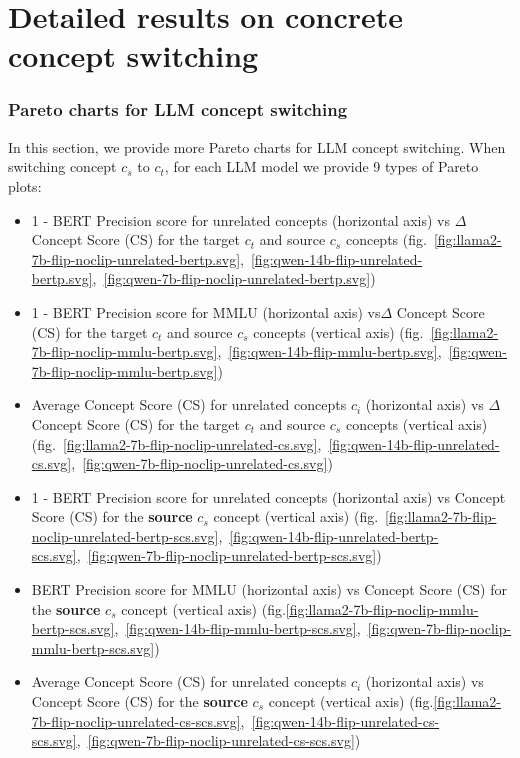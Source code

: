 \section{Detailed results on concrete concept switching}

\subsubsection{Pareto charts for LLM concept switching}
\label{sec:pareto_llm_switch}

In this section, we provide more Pareto charts for LLM concept switching. When switching concept $c_s$ to $c_t$, for each LLM model we provide 9 types of Pareto plots: 
\begin{itemize}
    \item 1 - BERT Precision score for unrelated concepts (horizontal axis) vs \textbf{$\Delta$} Concept Score (CS) for the target $c_t$ and source $c_s$ concepts (fig.~\ref{fig:llama2-7b-flip-noclip-unrelated-bertp.svg},~\ref{fig:qwen-14b-flip-unrelated-bertp.svg},~\ref{fig:qwen-7b-flip-noclip-unrelated-bertp.svg})
    \item 1 - BERT Precision score for MMLU (horizontal axis) vs\textbf{$\Delta$} Concept Score (CS) for the target $c_t$ and source $c_s$ concepts (vertical axis) (fig.~\ref{fig:llama2-7b-flip-noclip-mmlu-bertp.svg},~\ref{fig:qwen-14b-flip-mmlu-bertp.svg},~\ref{fig:qwen-7b-flip-noclip-mmlu-bertp.svg})
    \item Average Concept Score (CS) for unrelated concepts $c_i$ (horizontal axis) vs \textbf{$\Delta$} Concept Score (CS) for the target $c_t$ and source $c_s$ concepts (vertical axis)  (fig.~\ref{fig:llama2-7b-flip-noclip-unrelated-cs.svg},~\ref{fig:qwen-14b-flip-unrelated-cs.svg},~\ref{fig:qwen-7b-flip-noclip-unrelated-cs.svg})
    
    \item 1 - BERT Precision score for unrelated concepts (horizontal axis) vs Concept Score (CS) for the \textbf{source} $c_s$ concept (vertical axis) (fig.~\ref{fig:llama2-7b-flip-noclip-unrelated-bertp-scs.svg},~\ref{fig:qwen-14b-flip-unrelated-bertp-scs.svg},~\ref{fig:qwen-7b-flip-noclip-unrelated-bertp-scs.svg})
    \item BERT Precision score for MMLU (horizontal axis) vs Concept Score (CS) for the \textbf{source} $c_s$ concept (vertical axis) (fig.\ref{fig:llama2-7b-flip-noclip-mmlu-bertp-scs.svg},~\ref{fig:qwen-14b-flip-mmlu-bertp-scs.svg},~\ref{fig:qwen-7b-flip-noclip-mmlu-bertp-scs.svg})
    \item Average Concept Score (CS) for unrelated concepts $c_i$ (horizontal axis) vs Concept Score (CS) for the \textbf{source} $c_s$ concept (vertical axis) (fig.\ref{fig:llama2-7b-flip-noclip-unrelated-cs-scs.svg},~\ref{fig:qwen-14b-flip-unrelated-cs-scs.svg},~\ref{fig:qwen-7b-flip-noclip-unrelated-cs-scs.svg})


\end{itemize}
